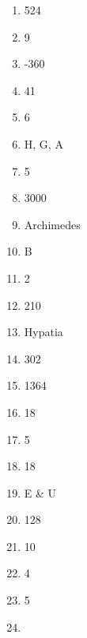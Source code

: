 \documentclass[../uilmath.tex]{subfiles}
\begin{document}
\begin{enumerate}[label=\bfseries\arabic*.]
    \item %
    524

    \item %
    9

    \item %
    -360

    \item %
    41

    \item %
    6

    \item %
    H, G, A 

    \item %
    5

    \item %
    3000

    \item %
    Archimedes

    \item %
    B 

    \item %
    2

    \item %
    210

    \item %
    Hypatia 

    \item %
    302

    \item %
    1364

    \item %
    18

    \item %
    5

    \item %
    18

    \item %
    E \& U 

    \item %
    128

    \item %
    10

    \item %
    4

    \item %
    5

    \item %
    
\end{enumerate}
\end{document}
